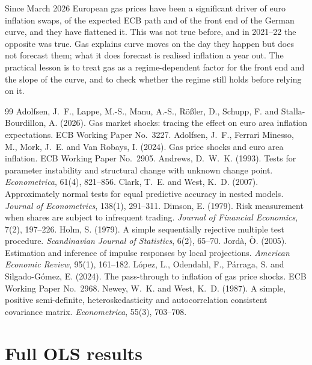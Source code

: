 \documentclass[11pt,a4paper]{article}
\begin{document}
Since March 2026 European gas prices have been a significant driver of euro inflation swaps, of the expected ECB path
and of the front end of the German curve, and they have flattened it. This was not true before, and in 2021--22 the
opposite was true. Gas explains curve moves on the day they happen but does not forecast them; what it does forecast is
realised inflation a year out. The practical lesson is to treat gas as a regime-dependent factor for the front end and
the slope of the curve, and to check whether the regime still holds before relying on it.

\begin{thebibliography}{99}
 Adolfsen, J.~F., Lappe, M.-S., Manu, A.-S., R\"o{\ss}ler, D., Schupp, F. and Stalla-Bourdillon, A. (2026). Gas market shocks: tracing the effect on euro area inflation expectations. ECB Working Paper No.~3227.
 Adolfsen, J.~F., Ferrari Minesso, M., Mork, J.~E. and Van Robays, I. (2024). Gas price shocks and euro area inflation. ECB Working Paper No.~2905.
 Andrews, D.~W.~K. (1993). Tests for parameter instability and structural change with unknown change point. \emph{Econometrica}, 61(4), 821--856.
 Clark, T.~E. and West, K.~D. (2007). Approximately normal tests for equal predictive accuracy in nested models. \emph{Journal of Econometrics}, 138(1), 291--311.
 Dimson, E. (1979). Risk measurement when shares are subject to infrequent trading. \emph{Journal of Financial Economics}, 7(2), 197--226.
 Holm, S. (1979). A simple sequentially rejective multiple test procedure. \emph{Scandinavian Journal of Statistics}, 6(2), 65--70.
 Jord\`a, \`O. (2005). Estimation and inference of impulse responses by local projections. \emph{American Economic Review}, 95(1), 161--182.
 L\'opez, L., Odendahl, F., P\'arraga, S. and Silgado-G\'omez, E. (2024). The pass-through to inflation of gas price shocks. ECB Working Paper No.~2968.
 Newey, W.~K. and West, K.~D. (1987). A simple, positive semi-definite, heteroskedasticity and autocorrelation consistent covariance matrix. \emph{Econometrica}, 55(3), 703--708.
\end{thebibliography}

\clearpage
\appendix
\section{Full OLS results}\label{app:ols}
\end{document}
